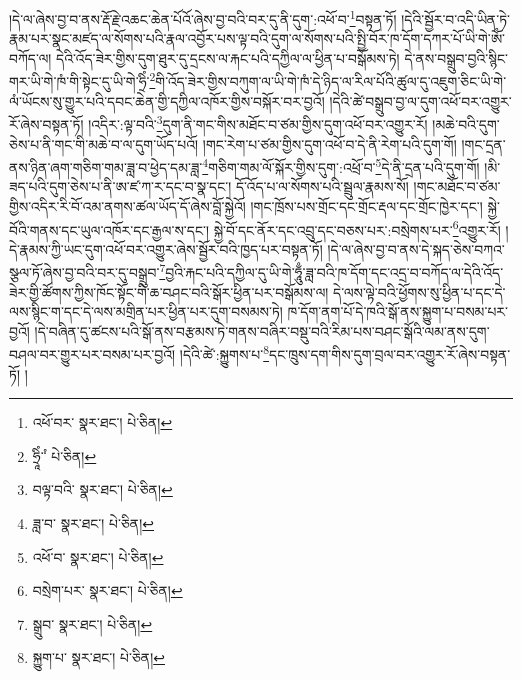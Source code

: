 །དེ་ལ་ཞེས་བྱ་བ་ནས་རྡོ་རྗེ་འཆང་ཆེན་པོའོ་ཞེས་བྱ་བའི་བར་དུ་ནི་དུག་:འཕོ་བ་\footnote{འཕོ་བར་  སྣར་ཐང་།  པེ་ཅིན། }བསྟན་ཏོ། །དེའི་སྦྱོར་བ་འདི་ཡིན་ཏེ་རྣམ་པར་སྣང་མཛད་ལ་སོགས་པའི་རྣལ་འབྱོར་པས་ལྟ་བའི་དུག་ལ་སོགས་པའི་སྤྱི་བོར་ཁ་དོག་དཀར་པོ་ཡི་གེ་ཨོཾ་བཀོད་ལ། དེའི་འོད་ཟེར་གྱིས་དུག་ཐུར་དུ་དྲངས་ལ་རྐང་པའི་དཀྱིལ་ལ་ཕྱིན་པ་བསྒོམས་ཏེ། དེ་ནས་བསྒྲུབ་བྱའི་སྙིང་གར་ཡི་གེ་ཁཾ་གི་སྟེང་དུ་ཡི་གེ་ཧྲིཾ་\footnote{ཧྲཱིཾ་ཾ་  པེ་ཅིན། }གི་འོད་ཟེར་གྱིས་བཀུག་ལ་ཡི་གེ་ཁཾ་དེ་ཉིད་ལ་རིལ་པོའི་ཚུལ་དུ་འཇུག་ཅིང་ཡི་གེ་ལཾ་ཡོངས་སུ་གྱུར་པའི་དབང་ཆེན་གྱི་དཀྱིལ་འཁོར་གྱིས་བསྐོར་བར་བྱའོ། །དེའི་ཚེ་བསྒྲུབ་བྱ་ལ་དུག་འཕོ་བར་འགྱུར་རོ་ཞེས་བསྟན་ཏོ། །འདིར་:ལྟ་བའི་\footnote{བལྟ་བའི་  སྣར་ཐང་།  པེ་ཅིན། }དུག་ནི་གང་གིས་མཐོང་བ་ཙམ་གྱིས་དུག་འཕོ་བར་འགྱུར་རོ། །མཆེ་བའི་དུག་ཅེས་པ་ནི་གང་གི་མཆེ་བ་ལ་དུག་ཡོད་པའོ། །གང་རེག་པ་ཙམ་གྱིས་དུག་འཕོ་བ་དེ་ནི་རེག་པའི་དུག་གོ། །གང་དྲན་ནས་ཉིན་ཞག་གཅིག་གམ་ཟླ་བ་ཕྱེད་དམ་ཟླ་\footnote{ཟླ་བ་  སྣར་ཐང་།  པེ་ཅིན། }གཅིག་གམ་ལོ་སྐོར་གྱིས་དུག་:འཕྲོ་བ་\footnote{འཕོ་བ་  སྣར་ཐང་།  པེ་ཅིན། }དེ་ནི་དྲན་པའི་དུག་གོ། །མི་ཟད་པའི་དུག་ཅེས་པ་ནི་ཨ་ཛ་ཀ་ར་དང་བ་སྣ་དང་། དོ་འོད་པ་ལ་སོགས་པའི་སྦྲུལ་རྣམས་སོ། །གང་མཐོང་བ་ཙམ་གྱིས་འདིར་རི་བོ་འམ་ནགས་ཚལ་ཡོད་དོ་ཞེས་བློ་སྐྱེའོ། །གང་ཁྲོས་པས་གྲོང་དང་གྲོང་རྡལ་དང་གྲོང་ཁྱེར་དང་། སྐྱེ་བོའི་གནས་དང་ཡུལ་འཁོར་དང་རྒྱལ་ས་དང་། སྐྱེ་བོ་དང་ནོར་དང་འབྲུ་དང་བཅས་པར་:བསྲེགས་པར་\footnote{བསྲེག་པར་  སྣར་ཐང་།  པེ་ཅིན། }འགྱུར་རོ། །དེ་རྣམས་ཀྱི་ཡང་དུག་འཕོ་བར་འགྱུར་ཞེས་སྦྱོར་བའི་ཁྱད་པར་བསྟན་ཏོ། །དེ་ལ་ཞེས་བྱ་བ་ནས་དེ་སྐད་ཅེས་བཀའ་སྩལ་ཏོ་ཞེས་བྱ་བའི་བར་དུ་བསྒྲུབ་\footnote{སྒྲུབ་  སྣར་ཐང་།  པེ་ཅིན། }བྱའི་རྐང་པའི་དཀྱིལ་དུ་ཡི་གེ་ཧཱུྃ་ཟླ་བའི་ཁ་དོག་དང་འདྲ་བ་བཀོད་ལ་དེའི་འོད་ཟེར་གྱི་ཚོགས་ཀྱིས་ཁོང་སྟོང་གི་ཆ་བཤང་བའི་སྒོར་ཕྱིན་པར་བསྒོམས་ལ། དེ་ལས་ལྟེ་བའི་ཕྱོགས་སུ་ཕྱིན་པ་དང་དེ་ལས་སྙིང་ག་དང་དེ་ལས་མགྲིན་པར་ཕྱིན་པར་དུག་བསམས་ཏེ། ཁ་དོག་ནག་པོ་དེ་ཁའི་སྒོ་ནས་སྐྱུག་པ་བསམ་པར་བྱའོ། །དེ་བཞིན་དུ་ཚངས་པའི་སྒོ་ནས་བརྩམས་ཏེ་གནས་བཞིར་བསྡུ་བའི་རིམ་པས་བཤང་སྒོའི་ལམ་ནས་དུག་བཤལ་བར་གྱུར་པར་བསམ་པར་བྱའོ། །དེའི་ཚེ་:སྐྱུགས་པ་\footnote{སྐྱུག་པ་  སྣར་ཐང་།  པེ་ཅིན། }དང་ཁྲུས་དག་གིས་དུག་བྲལ་བར་འགྱུར་རོ་ཞེས་བསྟན་ཏོ། །
